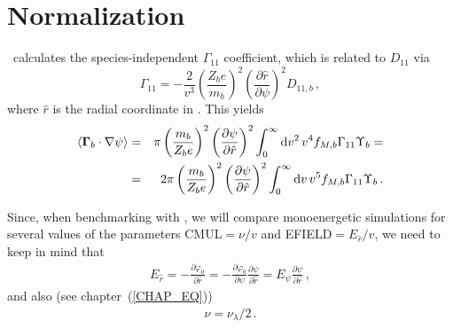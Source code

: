 \section{Normalization}\label{SEC_NORM}

\DKES~calculates the species-independent $\Gamma_{11}$ coefficient, which is related to $D_{11}$ via
\begin{equation}
\Gamma_{11} = -\frac{2}{v^3}\left(\frac{Z_be}{m_b}\right)^2\left(\frac{\partial\hat{r}}{\partial\psi}\right)^2 D_{11,b} \,,
\end{equation}\label{EQ_NORMDKES}
where $\hat{r}$ is the radial coordinate in \DKES. This yields
\begin{eqnarray}
\left\langle{\mathbf{\Gamma}_b\cdot \mathbf{\nabla}\psi}\right\rangle &=& \pi \left(\frac{m_b}{Z_be}\right)^2\left(\frac{\partial\psi}{\partial\hat{r}}\right)^2 \int_0^\infty\mathrm{d}v^2\,v^4 f_{M,b} \Gamma_{11}\Upsilon_b =\nonumber\\ 
&=& 2\pi \left(\frac{m_b}{Z_be}\right)^2\left(\frac{\partial\psi}{\partial\hat{r}}\right)^2 \int_0^\infty\mathrm{d}v\,v^5 f_{M,b} \Gamma_{11}\Upsilon_b\,.
\label{EQ_FLUX2}
\end{eqnarray}

Since, when benchmarking with \DKES, we will compare monoenergetic simulations for several values of the parameters {\ttfamily CMUL}$=\nu/v$ and {\ttfamily EFIELD}$=E_{\hat{r}}/v$, we need to keep in mind that
\begin{eqnarray}
E_{\hat{r}}= -\frac{\partial\varphi_0}{\partial\hat{r}} = -\frac{\partial\varphi_0}{\partial\psi}\frac{\partial\psi}{\partial\hat{r}}=E_\psi\frac{\partial\psi}{\partial\hat{r}}\,,
\end{eqnarray}
and also (see chapter~(\ref{CHAP_EQ}))
\begin{eqnarray}
\nu = \nu_\lambda/2\,.
\end{eqnarray}

%
